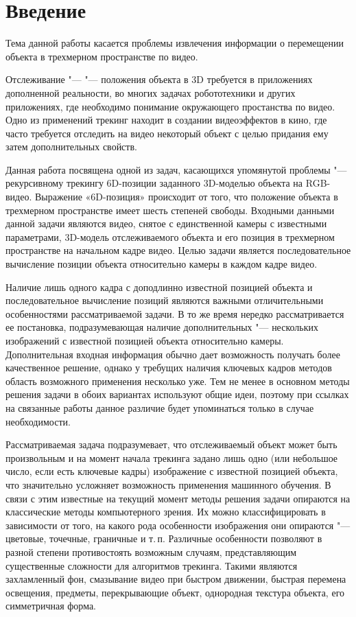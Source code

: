 \section{Введение}

Тема данной работы касается проблемы извлечения информации о перемещении
объекта в трехмерном пространстве по видео.

Отслеживание "---  "--- положения объекта в 3D требуется в
приложениях дополненной реальности\cite{Radkowski}, во многих задачах
робототехники\cite{Robotics} и других приложениях, где необходимо понимание
окружающего простанства по видео.
Одно из применений трекинг находит в создании видеоэффектов в кино, где часто
требуется отследить на видео некоторый объект с целью придания ему затем
дополнительных свойств\cite{Bugaev_2018_ECCV}.

Данная работа посвящена одной из задач, касающихся упомянутой проблемы "---
рекурсивному трекингу 6D-позиции заданного 3D-моделью объекта на RGB-видео.
Выражение «6D-позиция» происходит от того, что положение объекта в трехмерном
пространстве имеет шесть степеней свободы.
Входными данными данной задачи являются видео, снятое с единственной
камеры с известными параметрами, 3D-модель отслеживаемого объекта
и его позиция в трехмерном пространстве на начальном кадре видео.
Целью задачи является последовательное вычисление позиции объекта относительно
камеры в каждом кадре видео.

Наличие лишь одного кадра с доподлинно известной позицией объекта и
последовательное вычисление позиций являются важными отличительными
особенностями рассматриваемой задачи.
В то же время нередко рассматривается ее постановка, подразумевающая наличие
дополнительных  "--- нескольких изображений с известной
позицией объекта относительно камеры.
Дополнительная входная информация обычно дает возможность получать более
качественное решение, однако у требущих наличия ключевых кадров методов область
возможного применения несколько уже.
Тем не менее в основном методы решения задачи в обоих вариантах используют
общие идеи, поэтому при ссылках на связанные работы данное различие будет
упоминаться только в случае необходимости.

Рассматриваемая задача подразумевает, что отслеживаемый объект может быть
произвольным и на момент начала трекинга задано лишь одно (или небольшое
число, если есть ключевые кадры) изображение с известной позицией объекта,
что значительно усложняет возможность применения машинного обучения.
В связи с этим известные на текущий момент методы решения задачи опираются на
классические методы компьютерного зрения.
Их можно классифицировать в зависимости от того, на какого рода особенности
изображения они опираются "--- цветовые, точечные, граничные и т.\,п.
Различные особенности позволяют в разной степени противостоять возможным
случаям, представляющим существенные сложности для алгоритмов трекинга.
Такими являются захламленный фон, смазывание видео при быстром движении,
быстрая перемена освещения, предметы, перекрывающие объект,
однородная текстура объекта, его симметричная форма.

